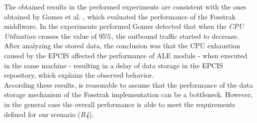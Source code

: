         The obtained results in the performed experiments are consistent with the ones obtained by Gomes
        et al. \cite{gomes2014future}, which evaluated the performance of the Fosstrak middlware. In the experiments
        performed Gomes detected that when the \textit{CPU Utilization} crosses the value of 95$\%$, the outbound
        traffic started to decrease. After analyzing the stored data, the conclusion was that the \gls{CPU} exhaustion
        caused by the \gls{EPCIS} affected the performance of \gls{ALE} module - when executed in the same
        machine - resulting in a delay of data storage in the \gls{EPCIS} repository, which explains the
        observed behavior.\\

        According these results, is reasonable to assume that the performance of the data storage mechanism of
        the Fosstrak implementation can be a bottleneck. However, in the general case the overall performance
        is able to meet the requirements defined for our scenario (\textit{R4}).
